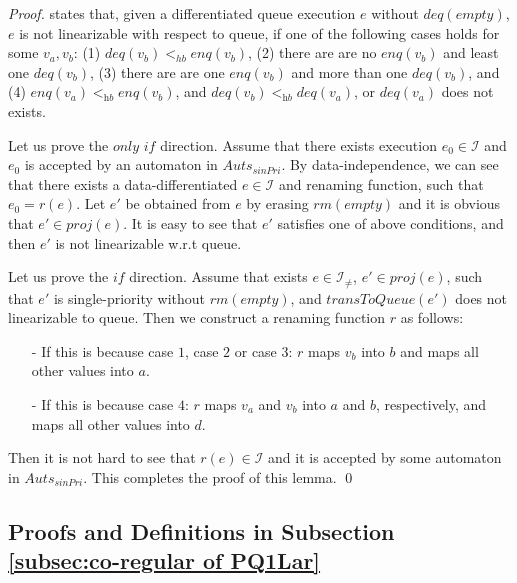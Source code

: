 \begin {proof}

\cite{Bouajjani:2015} states that, given a differentiated queue execution $e$ without $\textit{deq}(\textit{empty})$, $e$ is not linearizable with respect to queue, if one of the following cases holds for some $v_a,v_b$: (1) $\textit{deq}(v_b) <_{hb} \textit{enq}(v_b)$, (2) there are are no $\textit{enq}(v_b)$ and least one $\textit{deq}(v_b)$, (3) there are are one $\textit{enq}(v_b)$ and more than one $\textit{deq}(v_b)$, and (4) $\textit{enq}(v_a) <_{\textit{hb}} \textit{enq}(v_b)$, and $\textit{deq}(v_b) <_{\textit{hb}} \textit{deq}(v_a)$, or $\textit{deq}(v_a)$ does not exists.

Let us prove the $\textit{only if}$ direction. Assume that there exists execution $e_0 \in \mathcal{I}$ and $e_0$ is accepted by an automaton in $\textit{Auts}_{\textit{sinPri}}$. By data-independence, we can see that there exists a data-differentiated $e \in \mathcal{I}$ and renaming function, such that $e_0=r(e)$. Let $e'$ be obtained from $e$ by erasing $\textit{rm}(\textit{empty})$ and it is obvious that $e' \in \textit{proj}(e)$. It is easy to see that $e'$ satisfies one of above conditions, and then $e'$ is not linearizable w.r.t queue.

Let us prove the $\textit{if}$ direction. Assume that exists $e \in \mathcal{I}_{\neq}$, $e' \in \textit{proj}(e)$, such that $e'$ is single-priority  without $\textit{rm}(\textit{empty})$, and $\textit{transToQueue}(e')$ does not linearizable to queue. Then we construct a renaming function $r$ as follows:

\begin{itemize}
\setlength{\itemsep}{0.5pt}
\item[-] If this is because case $1$, case $2$ or case $3$: $r$ maps $v_b$ into $b$ and maps all other values into $a$.

\item[-] If this is because case $4$: $r$ maps $v_a$ and $v_b$ into $a$ and $b$, respectively, and maps all other values into $d$.
\end{itemize}

Then it is not hard to see that $r(e) \in \mathcal{I}$ and it is accepted by some automaton in $\textit{Auts}_{\textit{sinPri}}$. This completes the proof of this lemma. \qed
\end {proof}




\subsection{Proofs and Definitions in Subsection \ref{subsec:co-regular of PQ1Lar}}
\label{sec:appendix proof and definition in section co-regular of PQ1Lar}

